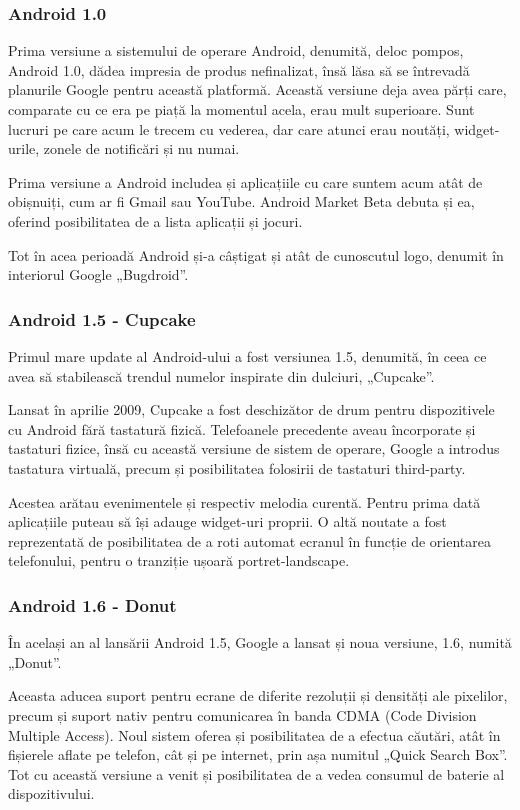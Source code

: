 \documentclass[12pt,a4paper]{article}
\begin{document}
\subsubsection{Android 1.0}
Prima versiune a sistemului de operare Android, denumită, deloc pompos, Android 1.0, dădea impresia de produs nefinalizat, însă lăsa să se întrevadă planurile Google pentru această platformă. Această versiune deja avea părți care, comparate cu ce era  pe piață la momentul acela, erau mult superioare. Sunt lucruri pe care acum le trecem cu vederea, dar care atunci erau noutăți, widget-urile, zonele de notificări și nu numai. 

Prima versiune a Android includea și aplicațiile cu care suntem acum atât de obișnuiți, cum ar fi Gmail sau YouTube. Android Market Beta debuta și ea, oferind posibilitatea de a lista aplicații și jocuri.

Tot în acea perioadă Android și-a câștigat și atât de cunoscutul logo, denumit în interiorul Google „Bugdroid”.


\subsubsection{Android 1.5 - Cupcake}
Primul mare update al Android-ului a fost versiunea 1.5, denumită, în ceea ce avea să stabilească trendul numelor inspirate din dulciuri, „Cupcake”.

	Lansat în aprilie 2009, Cupcake a fost deschizător de drum pentru dispozitivele cu Android fără tastatură fizică. Telefoanele precedente aveau încorporate și tastaturi fizice, însă cu această versiune de sistem de operare, Google a introdus tastatura virtuală, precum și posibilitatea folosirii de tastaturi third-party.

	Acestea arătau evenimentele și respectiv melodia curentă. Pentru prima dată aplicațiile puteau să își adauge widget-uri proprii. O altă noutate a fost reprezentată de posibilitatea de a roti automat ecranul în funcție de orientarea telefonului, pentru o tranziție ușoară portret-landscape.


\subsubsection{Android 1.6 - Donut}
În același an al lansării Android 1.5, Google a lansat și noua versiune, 1.6, numită „Donut”.
	
	Aceasta aducea suport pentru ecrane de diferite rezoluții și densități ale pixelilor, precum și suport nativ pentru comunicarea în banda CDMA (Code Division Multiple Access). Noul sistem oferea și posibilitatea de a efectua căutări, atât în fișierele aflate pe telefon, cât și pe internet, prin așa numitul „Quick Search Box”. Tot cu această versiune a venit și posibilitatea de a vedea consumul de baterie al dispozitivului.
	
\end{document}
